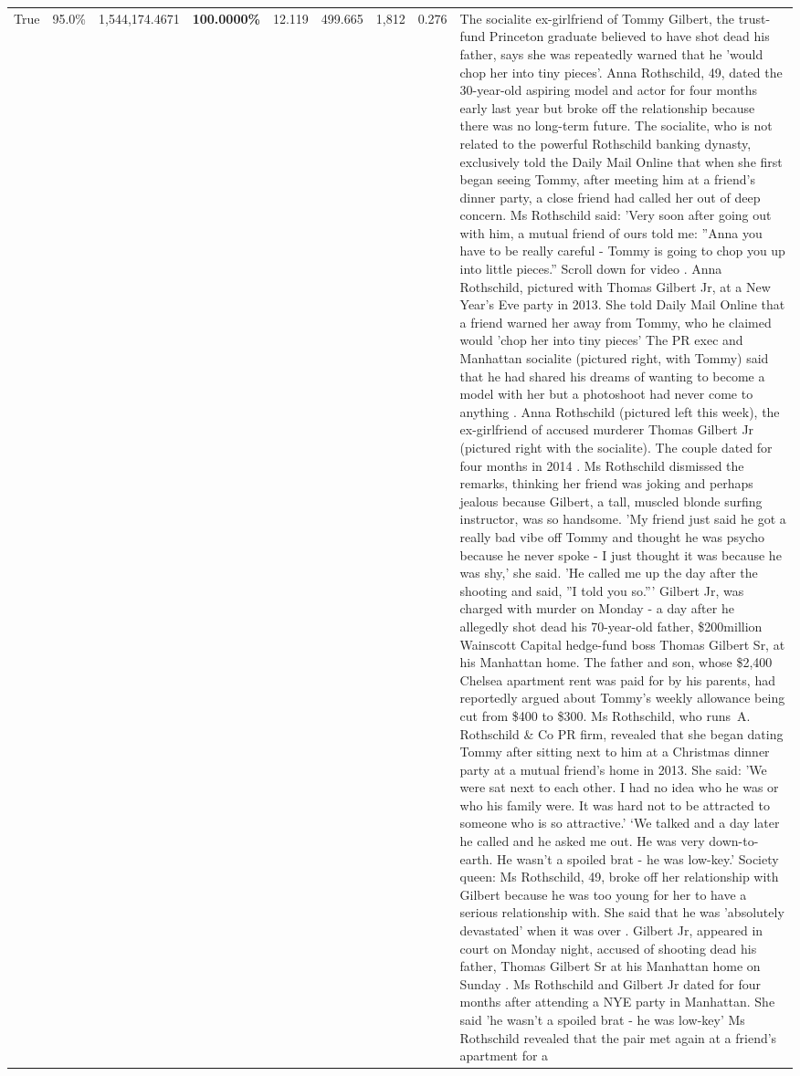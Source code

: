 \begin{table}[H]
\begin{tabular}{lllrlllll}
True & 95.0\% & 1,544,174.4671 & \bfseries \color{red} 100.0000\% & 12.119 & 499.665 & 1,812 & 0.276 & The socialite ex-girlfriend of Tommy Gilbert, the trust-fund Princeton graduate believed to have shot dead his father, says she was repeatedly warned that he 'would chop her into tiny pieces'. Anna Rothschild, 49, dated the 30-year-old aspiring model and actor for four months early last year but broke off the relationship because there was no long-term future. The socialite, who is not related to the powerful Rothschild banking dynasty, exclusively told the Daily Mail Online that when she first began seeing Tommy, after meeting him at a friend's dinner party, a close friend had called her out of deep concern. Ms Rothschild said: 'Very soon after going out with him, a mutual friend of ours told me: ''Anna you have to be really careful - Tommy is going to chop you up into little pieces.'' Scroll down for video . Anna Rothschild, pictured with Thomas Gilbert Jr, at a New Year's Eve party in 2013. She told Daily Mail Online that a friend warned her away from Tommy, who he claimed would 'chop her into tiny pieces' The PR exec and Manhattan socialite (pictured right, with Tommy) said that he had shared his dreams of wanting to become a model with her but a photoshoot had never come to anything . Anna Rothschild (pictured left this week), the ex-girlfriend of accused murderer Thomas Gilbert Jr (pictured right with the socialite). The couple dated for four months in 2014 . Ms Rothschild dismissed the remarks, thinking her friend was joking and perhaps jealous because Gilbert, a tall, muscled blonde surfing instructor, was so handsome. 'My friend just said he got a really bad vibe off Tommy and thought he was psycho because he never spoke - I just thought it was because he was shy,' she said. 'He called me up the day after the shooting and said, ''I told you so.''' Gilbert Jr, was charged with murder on Monday - a day after he allegedly shot dead his 70-year-old father, \$200million Wainscott Capital hedge-fund boss Thomas Gilbert Sr, at his Manhattan home. The father and son, whose \$2,400 Chelsea apartment rent was paid for by his parents, had reportedly argued about Tommy's weekly allowance being cut from \$400 to \$300. Ms Rothschild, who runs A. Rothschild \& Co PR firm, revealed that she began dating Tommy after sitting next to him at a Christmas dinner party at a mutual friend's home in 2013. She said: 'We were sat next to each other. I had no idea who he was or who his family were. It was hard not to be attracted to someone who is so attractive.' ‘We talked and a day later he called and he asked me out. He was very down-to-earth. He wasn’t a spoiled brat - he was low-key.’ Society queen: Ms Rothschild, 49, broke off her relationship with Gilbert because he was too young for her to have a serious relationship with. She said that he was 'absolutely devastated' when it was over . Gilbert Jr, appeared in court on Monday night, accused of shooting dead his father, Thomas Gilbert Sr at his Manhattan home on Sunday . Ms Rothschild and Gilbert Jr dated for four months after attending a NYE party in Manhattan. She said 'he wasn't a spoiled brat - he was low-key' Ms Rothschild revealed that the pair met again at a friend’s apartment for a 
\end{tabular}
\end{table}
